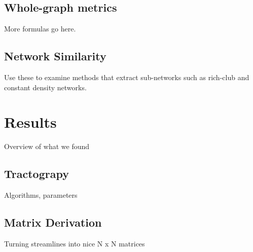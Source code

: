 \documentclass{frontiersSCNS} %
\begin{document}
\subsection{Whole-graph metrics}
More formulas go here.

\subsection{Network Similarity}
Use these to examine methods that extract sub-networks such as rich-club and constant density networks.



\section{Results}
Overview of what we found

\subsection{Tractograpy}
Algorithms, parameters

\subsection{Matrix Derivation}
Turning streamlines into nice N x N matrices

\end{document}
